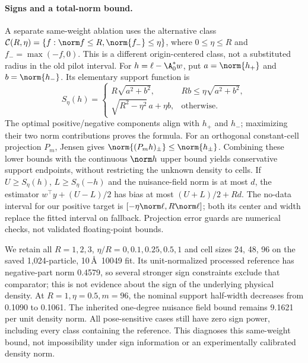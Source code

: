 \paragraph{Signs and a total-norm bound.}
A separate same-weight ablation uses the alternative class
$\mathcal C(R,\eta)=\{f:\norm f\le R,\norm{f_-}\le\eta\}$,
where $0\le\eta\le R$ and $f_-=\max(-f,0)$. This is a different
origin-centered class, not a substituted radius in the old pilot interval.
For $h=\ell-\A_0^*w$, put $a=\norm{h_+}$ and $b=\norm{h_-}$.
Its elementary support function is
\[
 S_\eta(h)=\begin{cases}
 R\sqrt{a^2+b^2},& Rb\le\eta\sqrt{a^2+b^2},\\
 \sqrt{R^2-\eta^2}\,a+\eta b,&\text{otherwise}.
 \end{cases}
\]
The optimal positive/negative components align with $h_+$ and $h_-$;
maximizing their two norm contributions proves the formula. For an orthogonal
constant-cell projection $P_m$, Jensen gives
$\norm{(P_mh)_\pm}\le\norm{h_\pm}$. Combining these lower bounds with
the continuous $\norm h$ upper bound yields conservative support endpoints,
without restricting the unknown density to cells. If $U\ge S_\eta(h)$,
$L\ge S_\eta(-h)$ and the nuisance-field norm is at most $d$, the estimator
$w^\top y+(U-L)/2$ has bias at most $(U+L)/2+Rd$. The no-data interval
for our positive target is $[-\eta\norm\ell,R\norm\ell]$; both its center
and width replace the fitted interval on fallback. Projection error guards
are numerical checks, not validated floating-point bounds.

We retain all $R=1,2,3$, $\eta/R=0,0.1,0.25,0.5,1$ and cell sizes
24, 48, 96 on the saved 1,024-particle, 10\,\AA\ 10049 fit. Its unit-normalized
processed reference has negative-part norm 0.4579, so several stronger sign
constraints exclude that comparator; this is not evidence about the sign of
the underlying physical density. At $R=1,\eta=0.5,m=96$, the nominal support
half-width decreases from 0.1090 to 0.1061. The inherited one-degree nuisance
field bound remains 9.1621 per unit density norm. All pose-sensitive cases
still have zero sign power, including every class containing the reference.
This diagnoses this same-weight bound, not impossibility under sign information
or an experimentally calibrated density norm.



